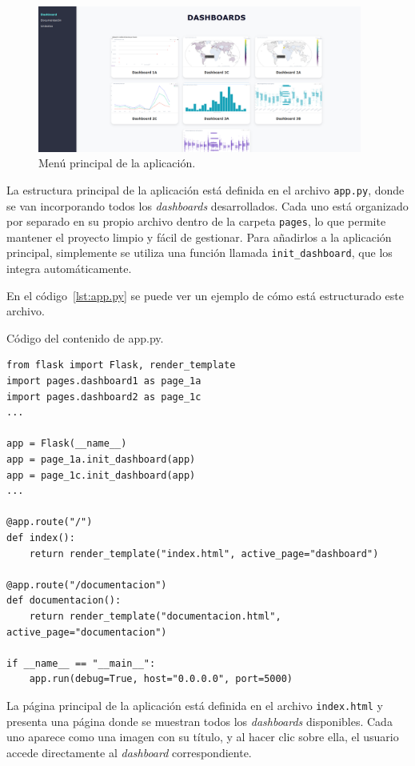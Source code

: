 \documentclass[a4paper, 12pt]{book}
\begin{document}
\begin{figure}[H]
\centering
\includegraphics[width=0.95\textwidth]{img/menu.png}
\caption{Menú principal de la aplicación.}
\label{fig:menu}
\end{figure}

La estructura principal de la aplicación está definida en el archivo \texttt{app.py}, donde se van incorporando todos los \textit{dashboards} desarrollados. Cada uno está organizado por separado en su propio archivo dentro de la carpeta \texttt{pages}, lo que permite mantener el proyecto limpio y fácil de gestionar. Para añadirlos a la aplicación principal, simplemente se utiliza una función llamada \texttt{init\_dashboard}, que los integra automáticamente.

En el código~\ref{lst:app.py} se puede ver un ejemplo de cómo está estructurado este archivo.

\begin{listing}[h!]
\caption{Código del contenido de app.py.}
\label{lst:app.py}
\begin{verbatim}
from flask import Flask, render_template
import pages.dashboard1 as page_1a
import pages.dashboard2 as page_1c
...

app = Flask(__name__)
app = page_1a.init_dashboard(app)
app = page_1c.init_dashboard(app)
...

@app.route("/")
def index():
    return render_template("index.html", active_page="dashboard")

@app.route("/documentacion")
def documentacion():
    return render_template("documentacion.html", active_page="documentacion")

if __name__ == "__main__":
    app.run(debug=True, host="0.0.0.0", port=5000)
\end{verbatim}
\end{listing}

La página principal de la aplicación está definida en el archivo \texttt{index.html} y presenta una página donde se muestran todos los \textit{dashboards} disponibles. Cada uno aparece como una imagen con su título, y al hacer clic sobre ella, el usuario accede directamente al \textit{dashboard} correspondiente.
\end{document}
